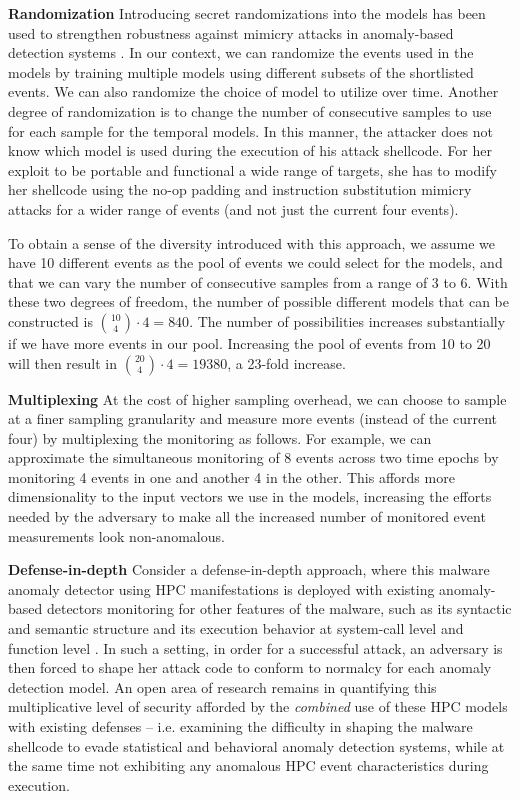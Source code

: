 \documentclass{acm_proc_article-sp}
\begin{document}
\textbf{Randomization} \space\space Introducing secret randomizations into the models has been used to strengthen robustness against mimicry attacks in anomaly-based detection systems \cite{bruschi2007efficient, wang2006anagram}. In our context, we can randomize the events used in the models by training multiple models using different subsets of the shortlisted events. We can also randomize the choice of model to utilize over time. Another degree of randomization is to change the number of consecutive samples to use for each sample for the temporal models. In this manner, the attacker does not know which model is used during the execution of his attack shellcode. For her exploit to be portable and functional a wide range of targets, she has to modify her shellcode using the no-op padding and instruction substitution mimicry attacks for a wider range of events (and not just the current four events).

To obtain a sense of the diversity introduced with this approach, we assume we have 10 different events as the pool of events we could select for the models, and that we can vary the number of consecutive samples from a range of 3 to 6. With these two degrees of freedom, the number of possible different models that can be constructed is ${10 \choose 4}\cdot4 = 840$. The number of possibilities increases substantially if we have more events in our pool. Increasing the pool of events from 10 to 20 will then result in ${20 \choose 4}\cdot4 = 19380$, a 23-fold increase.

\textbf{Multiplexing} \space\space At the cost of higher sampling overhead, we can choose to sample at a finer sampling granularity and measure more events (instead of the current four) by multiplexing the monitoring as follows. For example, we can approximate the simultaneous monitoring of 8 events across two time epochs by monitoring 4 events in one and another 4 in the other. This affords more dimensionality to the input vectors we use in the models, increasing the efforts needed by the adversary to make all the increased number of monitored event measurements look non-anomalous.

\textbf{Defense-in-depth} \space\space Consider a defense-in-depth approach, where this malware anomaly detector using HPC manifestations is deployed with existing anomaly-based detectors monitoring for other features of the malware, such as its syntactic and semantic structure \cite{krugel2002service, wang2006anagram, kong2012sa3, mahoney2003network} and its execution behavior at system-call level \cite{hofmeyr1998intrusion, somayaji2000automated, forrest1996sense, marceau2001characterizing, sekar2001fast} and function level \cite{peisert2007analysis}. In such a setting, in order for a successful attack, an adversary is then forced to shape her attack code to conform to normalcy for each anomaly detection model. An open area of research remains in quantifying this multiplicative level of security afforded by the \textit{combined} use of these HPC models with existing defenses -- i.e. examining the difficulty in shaping the malware shellcode to evade statistical and behavioral anomaly detection systems, while at the same time not exhibiting any anomalous HPC event characteristics during execution.
\end{document}
